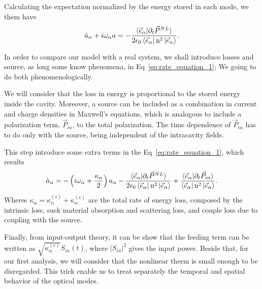 Calculating the expectation %
normalized by the energy stored in each mode, we them have 
\begin{equation}
    \dot{a}_\alpha + i \omega_\alpha a = -\frac{\braket{\vec{e}_\alpha|\partial_t\vec{P}^{NL}}}{2\epsilon_0\bra{\vec{e}_\alpha}\text{n}^2\ket{\vec{e}_\alpha}}.
    \label{eq:rate_equation_1}
\end{equation}

In order to compare our model with a real system, we shall introduce losses and source, as long some know phenomena, in Eq~\ref{eq:rate_equation_1}; We going to do both phenomenologically.

We will consider that the loss in energy is proportional to the stored energy inside the cavity. Moreover, a source can be included as a combination in current and charge densities in Maxwell's equations, which is analogous to include a polarization term, $\vec{P}_{in}$, to the total polarization. The time dependence of $\vec{P}_{in}$ has to do only with the source, being independent of the intracavity fields.

This step introduce some extra terms in the Eq~\ref{eq:rate_equation_1}, which results
\begin{equation}
    \dot{a}_\alpha = -\left(i\omega_\alpha +\frac{\kappa_\alpha}{2}\right)a_\alpha -\frac{\braket{\vec{e}_\alpha|\partial_t\vec{P}^{NL}}}{2\epsilon_0\bra{\vec{e}_\alpha}\text{n}^2\ket{\vec{e}_\alpha}}+\frac{\braket{\vec{e}_\alpha|\partial_t\vec{P}_{in}}}{\bra{\vec{e}_\alpha}\text{n}^2\ket{\vec{e}_\alpha}}.
\end{equation}
Wheres $\kappa_\alpha = \kappa^{(i)}_\alpha+\kappa^{(e)}_\alpha$ are the total rate of energy loss, composed by the intrinsic loss, suck material absorption and scattering loss, and couple loss due to coupling with the source. 

Finally, from input-output theory, it can be show that the feeding term can be written as $\sqrt{\kappa^{(e)}_\alpha}S_{in}(t)$, where $|S_{in}|^2$ gives the input power. Beside that, for our first analysis, we will consider that the nonlinear therm is small enough to be disregarded. This trick enable us to treat separately the temporal and spatial behavior of the optical modes. 

